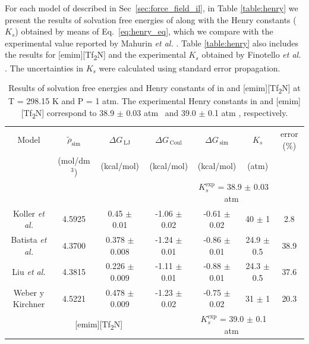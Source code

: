 \documentclass[3p,twocolumn]{elsarticle}
\begin{document}
For each model of \ce{[emim][B(CN)_4]} described in Sec~\ref{sec:force_field_il}, in Table \ref{table:henry} we present the results of solvation free energies of  along with the Henry constants ($K_s$) obtained by means of Eq.~\ref{eq:henry_eq}, which we compare with the experimental value reported by Mahurin \textit{et al.} \cite{Mahurin_2010}. Table \ref{table:henry} also includes the results for [emim][Tf\textsubscript{2}N] and the experimental $K_s$ obtained by Finotello \textit{et al.} \cite{Finotello_2008}. The uncertainties in $K_s$ were calculated using standard error propagation.

\begin{table}
\centering
\begin{adjustbox}{width=1\textwidth}
\begin{threeparttable}
\caption{Results of solvation free energies and Henry constants of  in \ce{[emim][B(CN)_4]} and [emim][Tf\textsubscript{2}N] at T = 298.15 K and P = 1 atm. The experimental Henry constants in \ce{[emim][B(CN)_4]} and [emim][Tf\textsubscript{2}N] correspond to 38.9 $\pm$ 0.03 atm~\cite{Mahurin_2010} and 39.0 $\pm$ 0.1 atm \cite{Finotello_2008}, respectively.}
\begin{tabular}{ c c c  c  c  c  c }  
\toprule
Model & $\tilde{\rho}_{\text{sim}}$ & $\Delta G_{\,\text{LJ}}$  & $\Delta G_{\,\text{Coul}}$  & $\Delta G_{\,\text{sim}}$ & $K_{s}$ & error (\%)\tnote{a}\\
& (mol/dm$^{3}$) & (kcal/mol) & (kcal/mol) &  (kcal/mol) & (atm)  &  \\
			\hline
			\multicolumn{4}{c}{\ce{[emim][B(CN)_4]}} & \multicolumn{2}{c}{\cellcolor{gray!25}$K_{s}^{\text{exp}}$ = 38.9 $\pm$ 0.03 atm~\cite{Mahurin_2010}}\\
			\hline
Koller \textit{et al.} \cite{Koller_2012} & 4.5925 & 0.45 $\pm$ 0.01 & -1.06 $\pm$ 0.02 & -0.61 $\pm$ 0.02 & 40 $\pm$ 1 & 2.8 \\
Batista \textit{et al.} \cite{Batista_2015} & 4.3700 & 0.378 $\pm$ 0.008 & -1.24 $\pm$ 0.01  & -0.86 $\pm$ 0.01 & 24.9 $\pm$ 0.5 & 38.9 \\
Liu \textit{et al.} \cite{Liu_2014} & 4.3815 & 0.226 $\pm$ 0.009 & -1.11 $\pm$ 0.01 & -0.88 $\pm$ 0.01 & 24.3 $\pm$ 0.5 & 37.6  \\
Weber y Kirchner \cite{Weber_2016} & 4.5221 & 0.478 $\pm$ 0.009 & -1.23 $\pm$ 0.02 & -0.75 $\pm$ 0.02 & 31 $\pm$ 1 & 20.3  \\
\hline
		\multicolumn{4}{c}{[emim][Tf\textsubscript{2}N]} & \multicolumn{2}{c}{ \cellcolor{gray!25} $K_{s}^{\text{exp}}$ = 39.0 $\pm$ 0.1 atm~\cite{Finotello_2008}}\\

\end{tabular}
\end{threeparttable}
\end{adjustbox}
\end{table}
\end{document}
